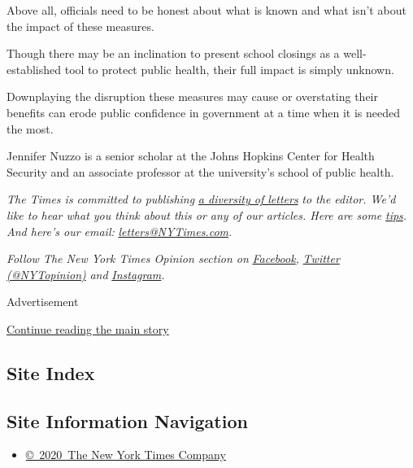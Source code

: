 Above all, officials need to be honest about what is known and what
isn't about the impact of these measures.

Though there may be an inclination to present school closings as a
well-established tool to protect public health, their full impact is
simply unknown.

Downplaying the disruption these measures may cause or overstating their
benefits can erode public confidence in government at a time when it is
needed the most.

Jennifer Nuzzo is a senior scholar at the Johns Hopkins Center for
Health Security and an associate professor at the university's school of
public health.

\emph{The Times is committed to publishing}
\href{https://www.nytimes3xbfgragh.onion/2019/01/31/opinion/letters/letters-to-editor-new-york-times-women.html}{\emph{a
diversity of letters}} \emph{to the editor. We'd like to hear what you
think about this or any of our articles. Here are some}
\href{https://help.nytimes3xbfgragh.onion/hc/en-us/articles/115014925288-How-to-submit-a-letter-to-the-editor}{\emph{tips}}\emph{.
And here's our email:}
\href{mailto:letters@NYTimes.com}{\emph{letters@NYTimes.com}}\emph{.}

\emph{Follow The New York Times Opinion section on}
\href{https://www.facebookcorewwwi.onion/nytopinion}{\emph{Facebook}}\emph{,}
\href{http://twitter.com/NYTOpinion}{\emph{Twitter (@NYTopinion)}}
\emph{and}
\href{https://www.instagram.com/nytopinion/}{\emph{Instagram}}\emph{.}

Advertisement

\protect\hyperlink{after-bottom}{Continue reading the main story}

\hypertarget{site-index}{%
\subsection{Site Index}\label{site-index}}

\hypertarget{site-information-navigation}{%
\subsection{Site Information
Navigation}\label{site-information-navigation}}

\begin{itemize}
\tightlist
\item
  \href{https://help.nytimes3xbfgragh.onion/hc/en-us/articles/115014792127-Copyright-notice}{©~2020~The
  New York Times Company}
\end{itemize}

